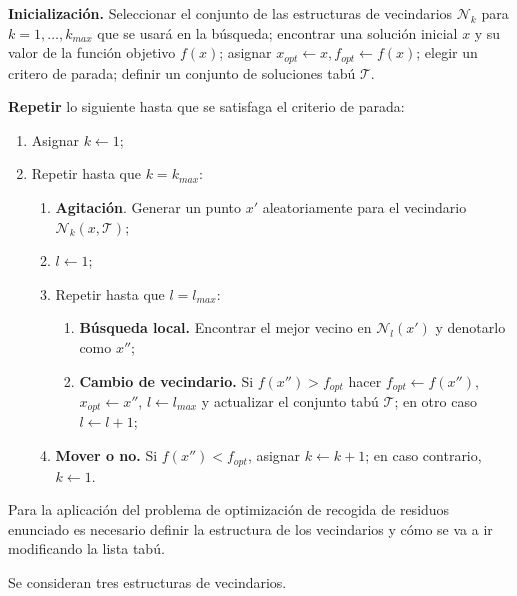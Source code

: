 \documentclass[
]{article}
\providecommand{\tightlist}{%
  \setlength{\itemsep}{0pt}\setlength{\parskip}{0pt}}
\begin{document}
\textbf{Inicialización.} Seleccionar el conjunto de las estructuras de
vecindarios \(\mathcal{N}_k\) para \(k=1,\ldots, k_{max}\) que se usará
en la búsqueda; encontrar una solución inicial \(x\) y su valor de la
función objetivo \(f(x)\); asignar
\(x_{opt}\leftarrow x, f_{opt}\leftarrow f(x)\); elegir un critero de
parada; definir un conjunto de soluciones tabú \(\mathcal{T}\).

\textbf{Repetir} lo siguiente hasta que se satisfaga el criterio de
parada:

\begin{enumerate}
\def\labelenumi{(\arabic{enumi})}
\tightlist
\item
  Asignar \(k\leftarrow 1\);
\item
  Repetir hasta que \(k=k_{max}\):

  \begin{enumerate}
  \def\labelenumii{(\alph{enumii})}
  \tightlist
  \item
    \textbf{Agitación}. Generar un punto \(x'\) aleatoriamente para el
    vecindario \(\mathcal{N}_k(x, \mathcal{T})\);
  \item
    \(l\leftarrow 1\);
  \item
    Repetir hasta que \(l=l_{max}\):

    \begin{enumerate}
    \def\labelenumiii{(\roman{enumiii})}
    \tightlist
    \item
      \textbf{Búsqueda local.} Encontrar el mejor vecino en
      \(\mathcal{N}_l(x')\) y denotarlo como \(x''\);
    \item
      \textbf{Cambio de vecindario.} Si \(f(x'') > f_{opt}\) hacer
      \(f_{opt}\leftarrow f(x'')\), \(x_{opt}\leftarrow x''\),
      \(l\leftarrow l_{max}\) y actualizar el conjunto tabú
      \(\mathcal{T}\); en otro caso \(l\leftarrow l + 1\);
    \end{enumerate}
  \item
    \textbf{Mover o no.} Si \(f(x'') < f_{opt}\), asignar
    \(k \leftarrow k + 1\); en caso contrario, \(k\leftarrow 1\).
  \end{enumerate}
\end{enumerate}

Para la aplicación del problema de optimización de recogida de residuos
enunciado es necesario definir la estructura de los vecindarios y cómo
se va a ir modificando la lista tabú.

Se consideran tres estructuras de vecindarios.
\end{document}
